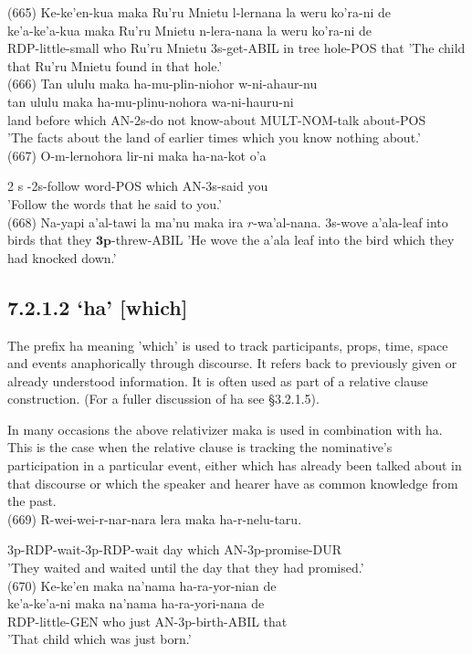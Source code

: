\documentclass[10pt]{article}
\begin{document}
(665) Ke-ke'en-kua maka Ru'ru Mnietu l-lernana la weru ko'ra-ni de\\
ke'a-ke'a-kua maka Ru'ru Mnietu n-lera-nana la weru ko'ra-ni de\\
RDP-little-small who Ru'ru Mnietu 3s-get-ABIL in tree hole-POS that 'The child that Ru'ru Mnietu found in that hole.'\\
(666) Tan ululu maka ha-mu-plin-niohor w-ni-ahaur-nu\\
tan ululu maka ha-mu-plinu-nohora wa-ni-hauru-ni\\
land before which AN-2s-do not know-about MULT-NOM-talk about-POS\\
'The facts about the land of earlier times which you know nothing about.'\\
(667) O-m-lernohora lir-ni maka ha-na-kot o'a

2 s -2s-follow word-POS which AN-3s-said you\\
'Follow the words that he said to you.'\\
(668) Na-yapi a'al-tawi la ma'nu maka ira \(r\)-wa'al-nana. 3s-wove a'ala-leaf into birds that they \(\boldsymbol{3} \boldsymbol{p}\)-threw-ABIL 'He wove the a'ala leaf into the bird which they had knocked down.'

\subsection*{7.2.1.2 ‘ha’ [which]}
The prefix ha meaning 'which' is used to track participants, props, time, space and events anaphorically through discourse. It refers back to previously given or already understood information. It is often used as part of a relative clause construction. (For a fuller discussion of ha see §3.2.1.5).

In many occasions the above relativizer maka is used in combination with ha. This is the case when the relative clause is tracking the nominative's participation in a particular event, either which has already been talked about in that discourse or which the speaker and hearer have as common knowledge from the past.\\
(669) R-wei-wei-r-nar-nara lera maka ha-r-nelu-taru.

3p-RDP-wait-3p-RDP-wait day which AN-3p-promise-DUR\\
'They waited and waited until the day that they had promised.'\\
(670) Ke-ke'en maka na'nama ha-ra-yor-nian de\\
ke'a-ke'a-ni maka na'nama ha-ra-yori-nana de\\
RDP-little-GEN who just AN-3p-birth-ABIL that\\
'That child which was just born.'
\end{document}
